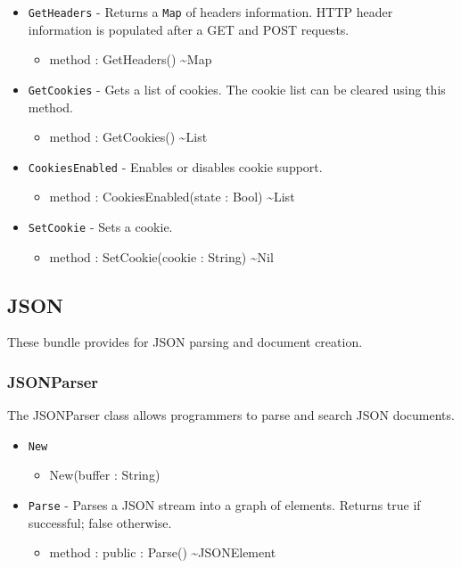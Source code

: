 \documentclass[11pt]{article}
\begin{document}
\begin{itemize}
\item \texttt{GetHeaders} - Returns a \texttt{Map} of headers
  information.  HTTP header information is populated after a GET and
  POST requests.
  \begin{itemize}
  \item method : GetHeaders() \textasciitilde Map
  \end{itemize}
\item \texttt{GetCookies} - Gets a list of cookies.  The cookie list
  can be cleared using this method.
  \begin{itemize}
  \item method : GetCookies() \textasciitilde List
  \end{itemize}
\item \texttt{CookiesEnabled} - Enables or disables cookie support.
  \begin{itemize}
  \item method : CookiesEnabled(state : Bool) \textasciitilde List
  \end{itemize}
\item \texttt{SetCookie} - Sets a cookie.
  \begin{itemize}
  \item method : SetCookie(cookie : String) \textasciitilde Nil
  \end{itemize}
\end{itemize}

\subsection{JSON}
These bundle provides for JSON parsing and document creation.

\subsubsection{JSONParser}
The JSONParser class allows programmers to parse and search JSON
documents.
\begin{itemize}
\item \texttt{New}
  \begin{itemize}
  \item New(buffer : String)
  \end{itemize}
\item \texttt{Parse} - Parses a JSON stream into a graph of elements.
  Returns true if successful; false otherwise.
  \begin{itemize}
  \item method : public : Parse() \textasciitilde JSONElement
  \end{itemize}
\end{itemize}
\end{document}
